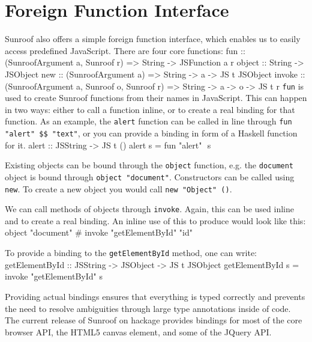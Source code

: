\documentclass{llncs}
\newcommand{\Src}[1]{{\tt{#1}}}
\newenvironment{Code}{\verbatim}{\endverbatim}
\begin{document}
\section{Foreign Function Interface}
\label{sec:ffi}

Sunroof also offers a simple foreign function interface, 
which enables us to easily 
access predefined JavaScript. There are four core functions:
\begin{Code}
fun    :: (SunroofArgument a, Sunroof r) 
       => String -> JSFunction a r
object :: String -> JSObject
new    :: (SunroofArgument a) 
       => String -> a -> JS t JSObject
invoke :: (SunroofArgument a, Sunroof o, Sunroof r) 
       => String -> a -> o -> JS t r
\end{Code}
\Src{fun} is used to create Sunroof functions from their names in JavaScript.
This can happen in two ways: either to call a function inline, or to 
create a real binding for that function. As an example, 
the \Src{alert} function can be called in line through \Src{fun "alert" \$\$ "text"},
or you can provide a binding in form of a Haskell function for it.
\begin{Code}
alert :: JSString -> JS t ()
alert s = fun "alert" $$ s
\end{Code}

Existing objects can be bound through the \Src{object} function, e.g.
the \Src{document} object is bound through \Src{object "document"}.
Constructors can be called using \Src{new}. To create a new
object you would call \Src{new "Object" ()}.

We can call methods of objects through \Src{invoke}. Again, this 
can be used inline and to create a real binding. An inline 
use of this to produce \linebreak\Src{document.getElementById("id")} would look like this: 
\begin{Code}
  object "document" # invoke "getElementById" "id"
\end{Code}

\newpage\noindent
To provide a binding 
to the \Src{getElementById} method, one can write:
\begin{Code}
getElementById :: JSString -> JSObject -> JS t JSObject
getElementById s = invoke "getElementById" s
\end{Code}

Providing actual bindings ensures that
everything is typed correctly and prevents the need to resolve ambiguities 
through large type annotations inside of code.
%
The current release of Sunroof on hackage provides bindings for most of the 
core browser API, the HTML5 canvas element, and some of the JQuery API.
\end{document}
